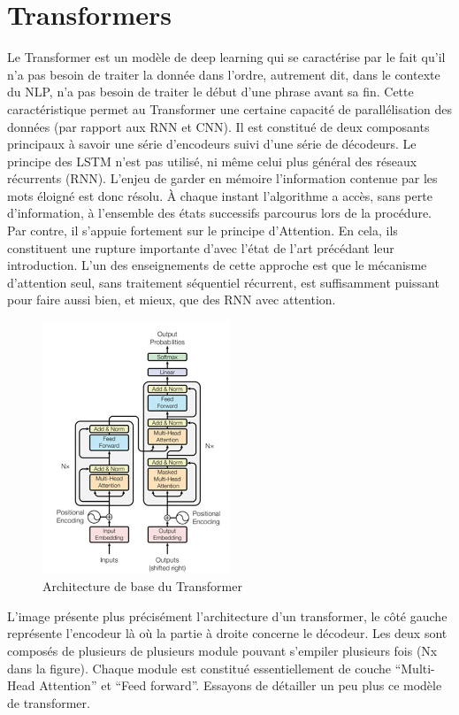 \documentclass[8pt]{article}
\begin{document}
    \hypertarget{transformers}{%
\section{Transformers}\label{transformers}}

    Le Transformer est un modèle de deep learning qui se caractérise par le
fait qu'il n'a pas besoin de traiter la donnée dans l'ordre, autrement
dit, dans le contexte du NLP, n'a pas besoin de traiter le début d'une
phrase avant sa fin. Cette caractéristique permet au Transformer une
certaine capacité de parallélisation des données (par rapport aux RNN et
CNN). Il est constitué de deux composants principaux à savoir une série
d'encodeurs suivi d'une série de décodeurs. Le principe des LSTM n'est
pas utilisé, ni même celui plus général des réseaux récurrents (RNN).
L'enjeu de garder en mémoire l'information contenue par les mots éloigné
est donc résolu. À chaque instant l'algorithme a accès, sans perte
d'information, à l'ensemble des états successifs parcourus lors de la
procédure. Par contre, il s'appuie fortement sur le principe
d'Attention. En cela, ils constituent une rupture importante d'avec
l'état de l'art précédant leur introduction. L'un des enseignements de
cette approche est que le mécanisme d'attention seul, sans traitement
séquentiel récurrent, est suffisamment puissant pour faire aussi bien,
et mieux, que des RNN avec attention.

\begin{figure}
\centering
\includegraphics[width=0.5\textwidth]{blog-17-3-7.jpg}
\caption{Architecture de base du Transformer}
\end{figure}

    L'image présente plus précisément l'architecture d'un transformer, le
côté gauche représente l'encodeur là où la partie à droite concerne le
décodeur. Les deux sont composés de plusieurs de plusieurs module
pouvant s'empiler plusieurs fois (Nx dans la figure). Chaque module est
constitué essentiellement de couche ``Multi-Head Attention'' et ``Feed
forward''. Essayons de détailler un peu plus ce modèle de transformer.
\end{document}
